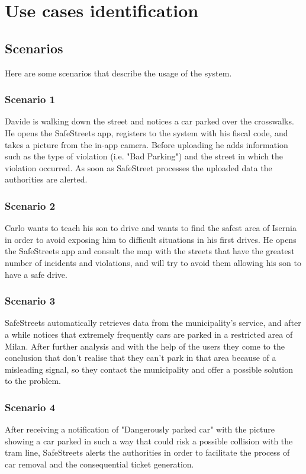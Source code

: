 \section{Use cases identification}
\subsection{Scenarios}
Here are some scenarios that describe the usage of the system.
\subsubsection{Scenario 1}
\label{scenario:1}
	Davide is walking down the street and notices a car parked over the crosswalks. He opens the SafeStreets app, registers to the system with his fiscal code, and takes a picture from the in-app camera. Before uploading he adds information such as the type of violation (i.e. "Bad Parking") and the street in which the violation occurred. As soon as SafeStreet processes the uploaded data the authorities are alerted.

\subsubsection{Scenario 2}
\label{scenario:2}
	Carlo wants to teach his son to drive and wants to find the safest area of Isernia in order to avoid exposing him to difficult situations in his first drives. He opens the SafeStreets app and consult the map with the streets that have the greatest number of incidents and violations, and will try to avoid them allowing his son to have a safe drive.

\subsubsection{Scenario 3}
\label{scenario:3}
	SafeStreets automatically retrieves data from the municipality's service, and after a while notices that extremely frequently cars are parked in a restricted area of Milan. After further analysis and with the help of the users they come to the conclusion that don't realise that they can't park in that area because of a misleading signal, so they contact the municipality and offer a possible solution to the problem.

\subsubsection{Scenario 4}
\label{scenario:4}
	After receiving a notification of "Dangerously parked car" with the picture showing a car parked in such a way that could risk a possible collision with the tram line, SafeStreets alerts the authorities in order to facilitate the process of car removal and the consequential ticket generation.

